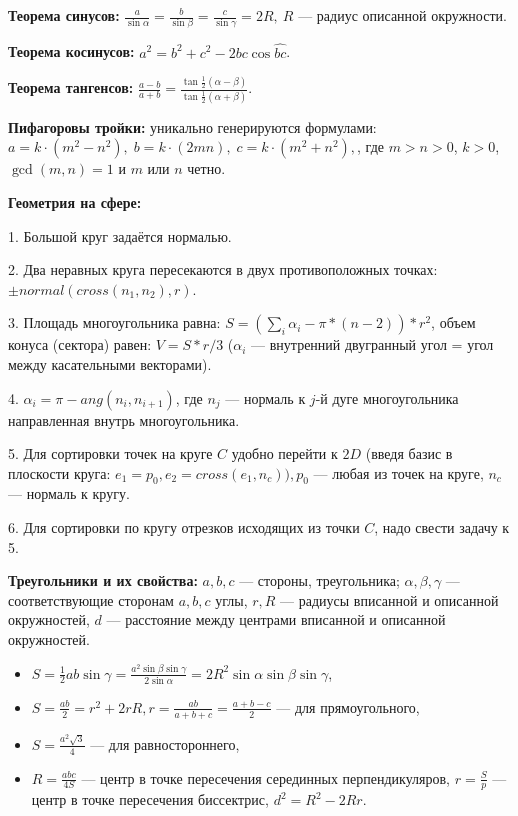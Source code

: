 \textbf{Теорема синусов:} $\frac{a}{\sin\alpha}=\frac{b}{\sin\beta}=\frac{c}{\sin\gamma}=2R,\ R$ --- радиус описанной окружности.

\textbf{Теорема косинусов:} $\displaystyle a^2 = b^2 + c^2 - 2bc\cos{\widehat{bc}}$.

\textbf{Теорема тангенсов:} $\displaystyle \frac{a-b}{a+b}=\frac{\tan\frac{1}{2}(\alpha -\beta)}{\tan\frac{1}{2}(\alpha +\beta)}$.

\textbf{Пифагоровы тройки:} уникально генерируются формулами:
$\displaystyle a = k \cdot (m^2 - n^2), \; b = k \cdot (2mn), \; c = k \cdot (m^2 + n^2),$, где $m > n > 0$, $k > 0$, $\gcd(m, n) = 1$ и $m$ или $n$ четно.

\textbf{Геометрия на сфере:}

1. Большой круг задаётся нормалью.

2. Два неравных круга пересекаются в двух противоположных точках: $\pm normal(cross(n_1, n_2), r)$.

3. Площадь многоугольника равна: $S = (\sum\limits_i\alpha_i - \pi * (n - 2)) * r^2$,
объем конуса (сектора) равен: $V = S * r / 3$ ($\alpha_i$ --- внутренний двугранный угол = угол между касательными векторами).

4. $\alpha_i = \pi - ang(n_i, n_{i + 1})$, где $n_j$ --- нормаль к $j$-й дуге многоугольника направленная внутрь многоугольника.

5. Для сортировки точек на круге $C$ удобно перейти к $2D$ (введя базис в плоскости круга:
$e_1 = p_0, e_2 = cross(e_1, n_c)), p_0$ --- любая из точек на круге, $n_c$ --- нормаль к кругу.

6. Для сортировки по кругу отрезков исходящих из точки $C$, надо свести задачу к 5.

\textbf{Треугольники и их свойства:}
$a, b, c$ --- стороны, треугольника;
$\alpha, \beta, \gamma$ --- соответствующие сторонам $a, b, c$ углы,
$r, R$ --- радиусы вписанной и описанной окружностей,
$d$ --- расстояние между центрами вписанной и описанной окружностей.

\begin{itemize}
    \item[$1.$] $S=\frac{1}{2}ab\sin\gamma=\frac{a^2\sin \beta\sin \gamma}{2\sin\alpha}=2R^2\sin\alpha\sin\beta\sin\gamma$,
	\item[$2.$] $S=\frac{ab}{2}=r^2+2rR, r = \frac{ab}{a + b + c} = \frac{a + b - c}2$ --- для прямоугольного,
	\item[$3.$] $S=\frac{a^2\sqrt 3}{4}$ --- для равностороннего,
    \item[$4.$] $R=\frac{abc}{4S}$ --- центр в точке пересечения серединных перпендикуляров,
	$r=\frac Sp$ --- центр в точке пересечения биссектрис, $d^2=R^2-2Rr$.
\end{itemize}

